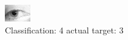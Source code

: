 \begin{figure}[h!]
\begin{center}
\includegraphics[width=0.60\columnwidth]{figures/ID1389_class_4_target_3.png}
\end{center}
\caption{ Classification: 4 actual target: 3}
\label{fig:ID1389_class_4_target_3}
\end{figure}
